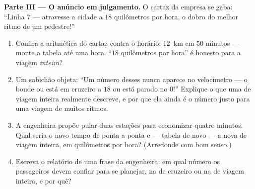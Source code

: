 \begin{problem}
\medskip\noindent\textbf{Parte III --- O anúncio em julgamento.}
O cartaz da empresa se gaba: ``Linha 7 --- atravesse a cidade a $18$
quilômetros por hora, o dobro do melhor ritmo de um pedestre!''
\begin{enumerate}[resume]
  \item Confira a aritmética do cartaz contra o horário:
        \qty{12}{km} em $50$ minutos --- monte a tabela até uma
        hora. ``$18$ quilômetros por hora'' é honesto para a viagem
        \emph{inteira}?
  \item Um sabichão objeta: ``Um número desses nunca aparece no
        velocímetro --- o bonde ou está em cruzeiro a $18$ ou está
        parado no $0$!'' Explique o que uma  de viagem
        inteira realmente descreve, e por que ela ainda é o número
        justo para uma viagem de muitos ritmos.
  \item A engenheira propõe pular duas estações para economizar
        quatro minutos. Qual seria o novo tempo de ponta a ponta e
        --- tabela de novo --- a nova  de viagem inteira,
        em quilômetros por hora? (Arredonde com bom senso.)
  \item Escreva o relatório de uma frase da engenheira: em qual
        número os passageiros devem confiar para se planejar, na
         de cruzeiro ou na  de viagem inteira, e
        por quê?
\end{enumerate}
\end{problem}
